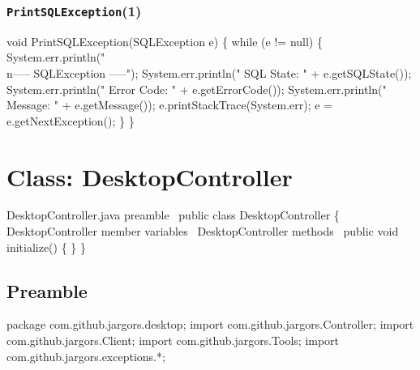 \subsection{\texttt{PrintSQLException}(1)}
\nwenddocs{}\endmoddef{}
void PrintSQLException(SQLException e) \{
  while (e != null) \{
    System.err.println("\\n----- SQLException -----");
    System.err.println("  SQL State:  " + e.getSQLState());
    System.err.println("  Error Code: " + e.getErrorCode());
    System.err.println("  Message:    " + e.getMessage());
    e.printStackTrace(System.err);
    e = e.getNextException();
  \}
\}
\eatline
{}\nwendcode{}\nwdocspar
\nwenddocs{}\chapter{Class: DesktopController}
\label{deskcon}

\nwenddocs{}\endmoddef{}
\LA{}DesktopController.java preamble~{\nwtagstyle{}}\RA{}
public class DesktopController \{
  \LA{}\code{}DesktopController\edoc{} member variables~{\nwtagstyle{}}\RA{}
  \LA{}\code{}DesktopController\edoc{} methods~{\nwtagstyle{}}\RA{}
  public void initialize() \{ \}
\}
\nwendcode{}\nwdocspar

\section{Preamble}
\nwenddocs{}\endmoddef{}
package com.github.jargors.desktop;
import com.github.jargors.Controller;
import com.github.jargors.Client;
import com.github.jargors.Tools;
import com.github.jargors.exceptions.*;
\nwendcode{}\nwdocspar

